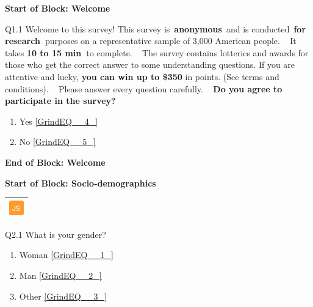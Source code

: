 \documentclass{article} %
\begin{document}
\eject 

\noindent \textbf{}

\noindent \textbf{Start of Block: Welcome}

\noindent 

\noindent Q1.1 Welcome to this survey!  This survey is~\textbf{anonymous}~and is conducted~\textbf{for research~}purposes on a representative sample of 3,000 American people. ~ It takes \textbf{10 to 15 min~}to complete.  ~  The survey contains lotteries and awards for those who get the correct answer to some understanding questions. If you are attentive and lucky, \textbf{you can win up to \$350} in points. (See terms and conditions). ~  Please answer every question carefully.  ~  \textbf{Do you agree to participate in the survey?}

\begin{enumerate}
\item  Yes  \eqref{GrindEQ__4_} 

\item  No  \eqref{GrindEQ__5_} 
\end{enumerate}

\noindent 

\noindent \textbf{End of Block: Welcome}

\noindent \textbf{}

\noindent \textbf{Start of Block: Socio-demographics}

\begin{tabular}{|p{0.2in}|} \hline 
\includegraphics*[width=0.25in, height=0.25in]{image1} \\ \hline 
\end{tabular}



\noindent Q2.1 What is your gender?

\begin{enumerate}
\item  Woman  \eqref{GrindEQ__1_} 

\item  Man  \eqref{GrindEQ__2_} 

\item  Other  \eqref{GrindEQ__3_} 
\end{enumerate}

\noindent 

\noindent 

\noindent 
\end{document}
